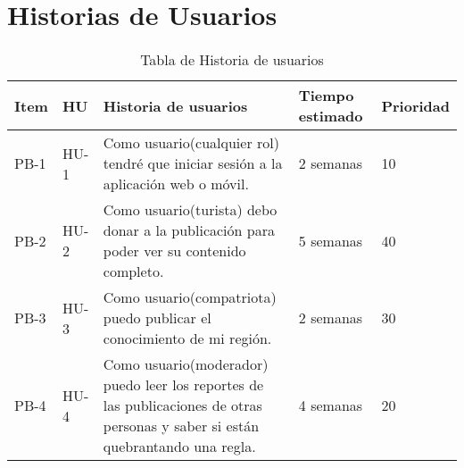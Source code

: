 \chapter{Historias de Usuarios}
\begin{table}[htbp]
	\begin{center}
		\begin{tabular}{|l|l|p{5cm}|l|l|}
			\hline
			Item &HU&Historia de usuarios&Tiempo estimado&Prioridad \\
			\hline \hline
			PB-1&HU-1&
			Como usuario(cualquier rol) tendré que iniciar sesión a la aplicación web o móvil.
			&2 semanas&10
			\\ \hline
			PB-2&HU-2&
			Como usuario(turista) debo donar a la publicación para poder ver su contenido completo.
			&5 semanas&40
			\\ \hline
			PB-3&HU-3&
			Como usuario(compatriota) puedo publicar el conocimiento de mi región.
			&2 semanas&30
			\\ \hline
			PB-4&HU-4&
			Como usuario(moderador) puedo leer los reportes de las publicaciones de otras personas y saber si están quebrantando una regla.
			&4 semanas&20
			\\ \hline
			
			
						
		\end{tabular}
		\caption {Tabla de Historia de usuarios}
	\end{center}
\end{table}